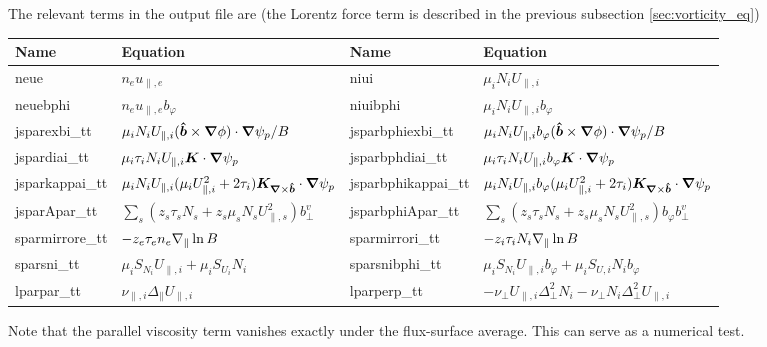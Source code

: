 The relevant terms in the output file are (the Lorentz force term is described in the previous subsection \ref{sec:vorticity_eq})
\begin{longtable}{llll}
\toprule
\rowcolor{gray!50}\textbf{Name} &  \textbf{Equation} &
\textbf{Name} &  \textbf{Equation}\\
\midrule
    neue &$n_e u_{\parallel,e}$ &
    niui &$\mu_i N_i U_{\parallel,i}$ \\
    neuebphi &$n_eu_{\parallel,e}b_\varphi$ &
    niuibphi &$\mu_i N_iU_{\parallel,i}b_\varphi$ \\
    jsparexbi\_tt       & $\mu_i N_iU_{\parallel,i}(\bm{\hat{b}}\times{\boldsymbol{\nabla}}\phi)\cdot{\boldsymbol{\nabla}} \psi_p/B$ &
    jsparbphiexbi\_tt   & $\mu_i N_iU_{\parallel,i}b_\varphi(\bm{\hat{b}}\times{\boldsymbol{\nabla}}\phi)\cdot{\boldsymbol{\nabla}} \psi_p/B$ \\
    jspardiai\_tt       & $\mu_i \tau_i N_iU_{\parallel,i}{\boldsymbol{K}}\cdot{\boldsymbol{\nabla}}\psi_p$ &
    jsparbphdiai\_tt   & $\mu_i \tau_i N_iU_{\parallel,i}b_\varphi{\boldsymbol{K}}\cdot{\boldsymbol{\nabla}}\psi_p$ \\
    jsparkappai\_tt       & $\mu_i N_iU_{\parallel,i} ( \mu_i U_{\parallel,i}^2 + 2\tau_i){\boldsymbol{K}}_{{\boldsymbol{\nabla}}\times \bm{\hat{b}}}\cdot{\boldsymbol{\nabla}}\psi_p$ &
    jsparbphikappai\_tt       & $\mu_i N_iU_{\parallel,i}b_\varphi ( \mu_i U_{\parallel,i}^2 + 2\tau_i){\boldsymbol{K}}_{{\boldsymbol{\nabla}}\times \bm{\hat{b}}}\cdot{\boldsymbol{\nabla}}\psi_p$ \\
    jsparApar\_tt       & $\sum_s (z_s \tau_s N_s + z_s \mu_s N_s U_{\parallel,s}^2)b_\perp^v$ &
    jsparbphiApar\_tt   & $\sum_s (z_s \tau_s N_s + z_s \mu_s N_s U_{\parallel,s}^2)b_\varphi b_\perp^v$ \\
    sparmirrore\_tt & $-z_e\tau_en_e\nabla_\parallel \ln B$ &
    sparmirrori\_tt & $-z_i\tau_iN_i\nabla_\parallel \ln B$ \\
    sparsni\_tt & $\mu_i S_{N_i} U_{\parallel,i} + \mu_i S_{U_i} N_i $ &
    sparsnibphi\_tt & $\mu_i S_{N_i} U_{\parallel,i}b_\varphi + \mu_i S_{U,i} N_i b_\varphi $ \\
    lparpar\_tt   & $\nu_{\parallel,i} \Delta_\parallel U_{\parallel,i}$ &
    lparperp\_tt & $-\nu_\perp U_{\parallel,i} \Delta_\perp^2 N_i - \nu_\perp N_i\Delta_\perp^2 U_{\parallel,i} $ \\
\bottomrule
\end{longtable}
Note that the parallel viscosity term vanishes exactly under the flux-surface average. This can serve as a numerical test.

